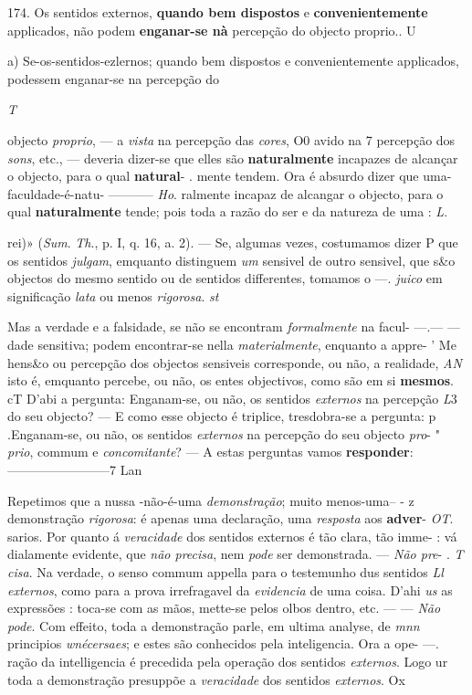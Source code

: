 174. Os sentidos externos, \textbf{quando bem dispostos} e \textbf{convenientemente} applicados, não podem \textbf{enganar-se nà} percepção do objecto proprio.. \textbar{} U

a) Se-os-sentidos-ezlernos; quando bem dispostos e convenientemente applicados, podessem enganar-se na percepção do

\emph{T}

objecto \emph{proprio}, --- a \emph{vista} na percepção das \emph{cores}, O0 avido na 7 percepção dos \emph{sons}, etc., --- deveria dizer-se que elles são \textbf{naturalmente} incapazes de alcançar o objecto, para o qual \textbf{natural}- . mente tendem. Ora é absurdo dizer que uma-faculdade-é-natu- ----------- \emph{Ho}. ralmente incapaz de alcangar o objecto, para o qual \textbf{naturalmente} tende; pois toda a razão do ser e da natureza de uma : \emph{L}.

rei)» (\emph{Sum}. \emph{Th}., p. I, q. 16, a. 2). --- Se, algumas vezes, costumamos dizer P que os sentidos \emph{julgam}, emquanto distinguem \emph{um} sensivel de outro sensivel, que s\&o objectos do mesmo sentido ou de sentidos differentes, tomamos o ---. \emph{juico} em significação \emph{lata} ou menos \emph{rigorosa}. \emph{st}

Mas a verdade e a falsidade, se não se encontram \emph{formalmente} na facul- ---.--- ---dade sensitiva; podem encontrar-se nella \emph{materialmente}, enquanto a appre- ' Me hens\&o ou percepção dos objectos sensiveis corresponde, ou não, a realidade, \emph{AN} isto é, emquanto percebe, ou não, os entes objectivos, como são em si \textbf{mesmos}. cT D'abi a pergunta: Enganam-se, ou não, os sentidos \emph{externos} na percepção \emph{L}3 do seu objecto? --- E como esse objecto é triplice, tresdobra-se a pergunta: p .Enganam-se, ou não, os sentidos \emph{externos} na percepção do seu objecto \emph{pro}- " \emph{prio}, commum e \emph{concomitante}? --- A estas perguntas vamos \textbf{responder}:------------------------7 Lan

Repetimos que a nussa -não-é-uma \emph{demonstração}; muito menos-uma-- - z demonstração \emph{rigorosa}: é apenas uma declaração, uma \emph{resposta} aos \textbf{adver}- \emph{OT}. sarios. Por quanto á \emph{veracidade} dos sentidos externos é tão clara, tão imme- : vá dialamente evidente, que \emph{não precisa}, nem \emph{pode} ser demonstrada. --- \emph{Não pre}- . \emph{T cisa}. Na verdade, o senso commum appella para o testemunho dus sentidos \emph{Ll externos}, como para a prova irrefragavel da \emph{evidencia} de uma coisa. D'ahi \emph{us} as expressões : toca-se com as mãos, mette-se pelos olbos dentro, etc. --- --- \emph{Não pode}. Com effeito, toda a demonstração parle, em ultima analyse, de \emph{mnn} principios \emph{wnécersaes}; e estes são conhecidos pela inteligencia. Ora a ope- ---. ração da intelligencia é precedida pela operação dos sentidos \emph{externos}. Logo ur toda a demonstração presuppõe a \emph{veracidade} dos sentidos \emph{externos}. Ox


